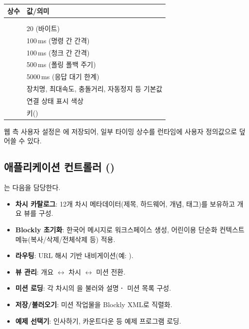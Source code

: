 \begin{longtable}{L{4.6cm} L{9.8cm}}
\toprule
{}\textbf{상수} & \textbf{값/의미} \\
\midrule
\endhead
{} &  \\
 &  \\
 & 20 (바이트) \\
 & 100\,ms (명령 간 간격) \\
 & 100\,ms (청크 간 간격) \\
 & 500\,ms (폴링 폴백 주기) \\
 & 5000\,ms (응답 대기 한계) \\
 & 장치명, 최대속도, 충돌거리, 자동정지 등 기본값 \\
 & 연결 상태 표시 색상 \\
 &  키() \\
\bottomrule
\end{longtable}

웹 측 사용자 설정은 에 저장되어, 일부 타이밍 상수를
런타임에 사용자 정의값으로 덮어쓸 수 있다.

\subsection{애플리케이션 컨트롤러 ()}

는 다음을 담당한다.

\begin{itemize}
  \item \textbf{차시 카탈로그}: 12개 차시 메타데이터(제목, 하드웨어, 개념, 태그)를
        보유하고 개요 뷰를 구성.
  \item \textbf{Blockly 초기화}: 한국어 메시지로 워크스페이스 생성, 어린이용
        단순화 컨텍스트 메뉴(복사/삭제/전체삭제 등) 적용.
  \item \textbf{라우팅}: URL 해시 기반 내비게이션(예: ).
  \item \textbf{뷰 관리}: 개요 $\leftrightarrow$ 차시 $\leftrightarrow$ 미션 전환.
  \item \textbf{미션 로딩}: 각 차시의 을 불러와 설명\textbf{·}
        미션 목록 구성.
  \item \textbf{저장/불러오기}: 미션 작업물을 Blockly XML로 직렬화.
  \item \textbf{예제 선택기}: 인사하기, 카운트다운 등 예제 프로그램 로딩.
\end{itemize}

